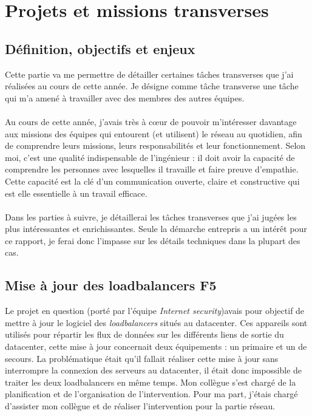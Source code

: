 \documentclass[a4paper,12pt]{report}
\begin{document}
\section{Projets et missions transverses}
\subsection{Définition, objectifs et enjeux}
Cette partie va me permettre de détailler certaines tâches transverses que j'ai réalisées au cours de cette année. Je désigne comme tâche transverse une tâche qui m'a amené à travailler avec des membres des autres équipes.
\paragraph{}
Au cours de cette année, j'avais très à cœur de pouvoir m'intéresser davantage aux missions des équipes qui entourent (et utilisent) le réseau au quotidien, afin de comprendre leurs missions, leurs responsabilités et leur fonctionnement. Selon moi, c'est une qualité indispensable de l'ingénieur : il doit avoir la capacité de comprendre les personnes avec lesquelles il travaille et faire preuve d'empathie. Cette capacité est la clé d'un communication ouverte, claire et constructive qui est elle essentielle à un travail efficace.
\paragraph{}
Dans les parties à suivre, je détaillerai les tâches transverses que j'ai jugées les plus intéressantes et enrichissantes. Seule la démarche entrepris a un intérêt pour ce rapport, je ferai donc l'impasse sur les détails techniques dans la plupart des cas.

\subsection{Mise à jour des loadbalancers F5} \label{f5}
Le projet en question (porté par l'équipe \textit{Internet security})avais pour objectif de mettre à jour le logiciel des \textit{loadbalancers} situés au datacenter. Ces appareils sont utilisés pour répartir les flux de données sur les différents liens de sortie du datacenter, cette mise à jour concernait deux équipements : un primaire et un de secours. La problématique était qu'il fallait réaliser cette mise à jour sans interrompre la connexion des serveurs au datacenter, il était donc impossible de traiter les deux loadbalancers en même temps. Mon collègue s'est chargé de la planification et de l'organisation de l'intervention.
Pour ma part, j'étais chargé d'assister mon collègue et de réaliser l'intervention pour la partie réseau. 
\end{document}
